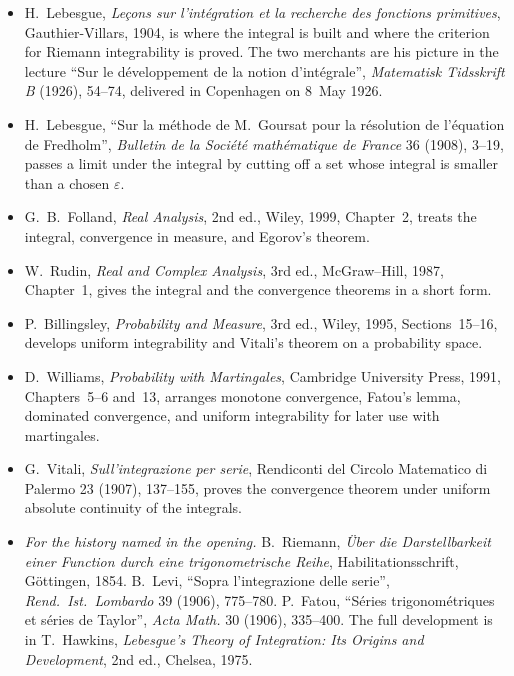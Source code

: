 \begin{itemize}
\item H.~Lebesgue, \emph{Le\c cons sur l'int\'egration et la recherche des fonctions primitives}, Gauthier-Villars, 1904, is where the integral is built and where the criterion for Riemann integrability is proved. The two merchants are his picture in the lecture ``Sur le d\'eveloppement de la notion d'int\'egrale'', \emph{Matematisk Tidsskrift B} (1926), 54--74, delivered in Copenhagen on 8~May 1926.
\item H.~Lebesgue, ``Sur la m\'ethode de M.~Goursat pour la r\'esolution de l'\'equation de Fredholm'', \emph{Bulletin de la Soci\'et\'e math\'ematique de France} 36 (1908), 3--19, passes a limit under the integral by cutting off a set whose integral is smaller than a chosen \(\varepsilon\).
\item G.~B.~Folland, \emph{Real Analysis}, 2nd ed., Wiley, 1999, Chapter~2, treats the integral, convergence in measure, and Egorov's theorem.
\item W.~Rudin, \emph{Real and Complex Analysis}, 3rd ed., McGraw--Hill, 1987, Chapter~1, gives the integral and the convergence theorems in a short form.
\item P.~Billingsley, \emph{Probability and Measure}, 3rd ed., Wiley, 1995, Sections~15--16, develops uniform integrability and Vitali's theorem on a probability space.
\item D.~Williams, \emph{Probability with Martingales}, Cambridge University Press, 1991, Chapters~5--6 and~13, arranges monotone convergence, Fatou's lemma, dominated convergence, and uniform integrability for later use with martingales.
\item G.~Vitali, \emph{Sull'integrazione per serie}, Rendiconti del Circolo Matematico di Palermo 23 (1907), 137--155, proves the convergence theorem under uniform absolute continuity of the integrals.
\item \emph{For the history named in the opening.} B.~Riemann, \emph{\"Uber die Darstellbarkeit einer Function durch eine trigonometrische Reihe}, Habilitationsschrift, G\"ottingen, 1854. B.~Levi, ``Sopra l'integrazione delle serie'', \emph{Rend.\ Ist.\ Lombardo} 39 (1906), 775--780. P.~Fatou, ``S\'eries trigonom\'etriques et s\'eries de Taylor'', \emph{Acta Math.} 30 (1906), 335--400. The full development is in T.~Hawkins, \emph{Lebesgue's Theory of Integration: Its Origins and Development}, 2nd ed., Chelsea, 1975.
\end{itemize}
